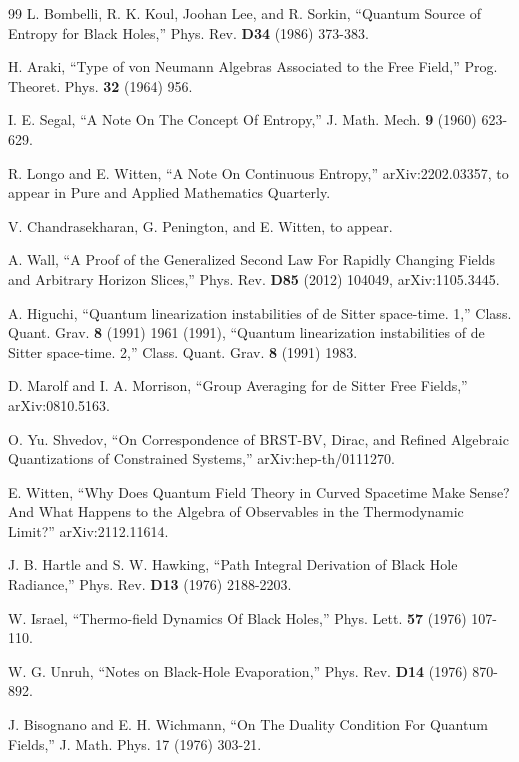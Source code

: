 \documentclass[11pt,a4paper]{article}
\begin{document}
\begin{thebibliography}{99}
L. Bombelli, R. K. Koul, Joohan Lee,
and R. Sorkin, ``Quantum Source of Entropy for Black Holes,''
Phys. Rev. {\bf D34} (1986) 373-383.

H. Araki,  ``Type of von Neumann Algebras Associated to the Free Field,''  Prog. Theoret. Phys. {\bf  32}
(1964) 956.



I. E. Segal, ``A Note On The Concept Of Entropy,''
J. Math. Mech. {\bf 9} (1960) 623-629.

R. Longo and E. Witten, ``A Note On Continuous Entropy,'' arXiv:2202.03357, to appear in Pure and Applied Mathematics Quarterly.



V. Chandrasekharan, G. Penington, and E. Witten, to appear.

A. Wall, ``A Proof of the Generalized Second Law For Rapidly Changing Fields and Arbitrary Horizon Slices,'' Phys. Rev. {\bf D85} (2012) 104049,
arXiv:1105.3445.


A. Higuchi, ``Quantum linearization instabilities of de Sitter space-time. 1,'' Class. Quant. Grav. {\bf 8} (1991) 1961 (1991),
``Quantum linearization instabilities of de Sitter space-time. 2,'' Class. Quant. Grav. {\bf 8} (1991)  1983.

D. Marolf and I. A. Morrison, ``Group Averaging for de Sitter Free Fields,'' arXiv:0810.5163.

O. Yu. Shvedov, ``On Correspondence of BRST-BV, Dirac,
and Refined Algebraic Quantizations of Constrained Systems,'' arXiv:hep-th/0111270.


E. Witten, ``Why Does Quantum Field Theory in Curved Spacetime Make Sense?   And What Happens to the Algebra of Observables in the Thermodynamic
Limit?'' arXiv:2112.11614.




 
 J. B. Hartle and S. W. Hawking, ``Path Integral Derivation
of Black Hole Radiance,'' Phys. Rev. {\bf D13} (1976) 2188-2203.

 W. Israel, ``Thermo-field Dynamics Of Black Holes,'' Phys. Lett. {\bf 57} (1976) 107-110.

W. G. Unruh, ``Notes on Black-Hole Evaporation,''
Phys. Rev. {\bf D14} (1976) 870-892.


  J. Bisognano and E. H. Wichmann, ``On The Duality Condition For Quantum Fields,'' J.
Math. Phys. 17 (1976) 303-21.



\end{thebibliography}
\end{document}
